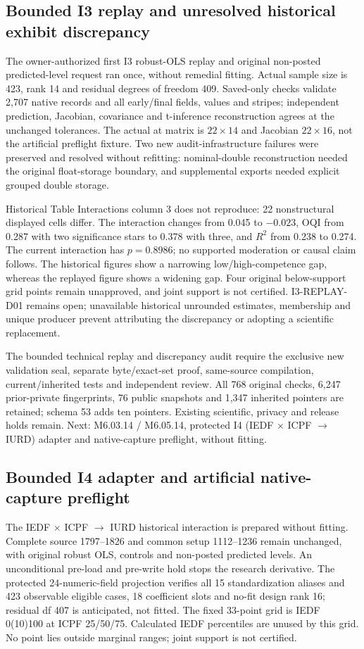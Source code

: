 \documentclass[11pt,a4paper]{article}
\begin{document}
\subsection*{Bounded I3 replay and unresolved historical exhibit discrepancy}
The owner-authorized first I3 robust-OLS replay and original non-posted predicted-level request ran once, without remedial fitting. Actual sample size is 423, rank 14 and residual degrees of freedom 409. Saved-only checks validate 2,707 native records and all early/final fields, values and stripes; independent prediction, Jacobian, covariance and t-inference reconstruction agrees at the unchanged tolerances. The actual at matrix is $22\times14$ and Jacobian $22\times16$, not the artificial preflight fixture. Two new audit-infrastructure failures were preserved and resolved without refitting: nominal-double reconstruction needed the original float-storage boundary, and supplemental exports needed explicit grouped double storage.

Historical Table Interactions column 3 does not reproduce: 22 nonstructural displayed cells differ. The interaction changes from 0.045 to $-0.023$, OQI from 0.287 with two significance stars to 0.378 with three, and $R^2$ from 0.238 to 0.274. The current interaction has $p=0.8986$; no supported moderation or causal claim follows. The historical figures show a narrowing low/high-competence gap, whereas the replayed figure shows a widening gap. Four original below-support grid points remain unapproved, and joint support is not certified. I3-REPLAY-D01 remains open; unavailable historical unrounded estimates, membership and unique producer prevent attributing the discrepancy or adopting a scientific replacement.

The bounded technical replay and discrepancy audit require the exclusive new validation seal, separate byte/exact-set proof, same-source compilation, current/inherited tests and independent review. All 768 original checks, 6,247 prior-private fingerprints, 76 public snapshots and 1,347 inherited pointers are retained; schema 53 adds ten pointers. Existing scientific, privacy and release holds remain. Next: M6.03.14 / M6.05.14, protected I4 (IEDF $\times$ ICPF $\rightarrow$ IURD) adapter and native-capture preflight, without fitting.
\subsection*{Bounded I4 adapter and artificial native-capture preflight}
The IEDF $\times$ ICPF $\rightarrow$ IURD historical interaction is prepared without fitting. Complete source 1797--1826 and common setup 1112--1236 remain unchanged, with original robust OLS, controls and non-posted predicted levels. An unconditional pre-load and pre-write hold stops the research derivative. The protected 24-numeric-field projection verifies all 15 standardization aliases and 423 observable eligible cases, 18 coefficient slots and no-fit design rank 16; residual df 407 is anticipated, not fitted. The fixed 33-point grid is IEDF 0(10)100 at ICPF 25/50/75. Calculated IEDF percentiles are unused by this grid. No point lies outside marginal ranges; joint support is not certified.
\end{document}
